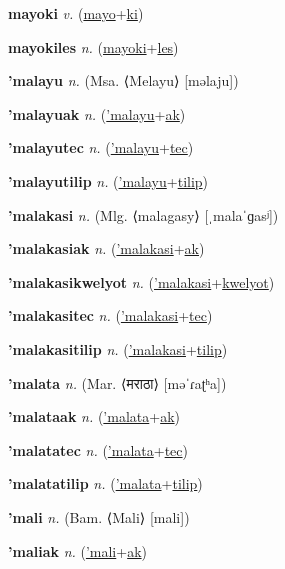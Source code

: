 \textbf{\hypertarget{mayoki}{mayoki}} \textit{v.} (\hyperlink{mayo}{mayo}+\allowbreak \hyperlink{ki}{ki})


\textbf{\hypertarget{mayokiles}{mayokiles}} \textit{n.} (\hyperlink{mayoki}{mayoki}+\allowbreak \hyperlink{les}{les})


\textbf{\hypertarget{'malayu}{'malayu}} \textit{n.} (Msa. ⟨Melayu⟩ [məlaju])


\textbf{\hypertarget{'malayuak}{'malayuak}} \textit{n.} (\hyperlink{'malayu}{'malayu}+\allowbreak \hyperlink{ak}{ak})


\textbf{\hypertarget{'malayutec}{'malayutec}} \textit{n.} (\hyperlink{'malayu}{'malayu}+\allowbreak \hyperlink{tec}{tec})


\textbf{\hypertarget{'malayutilip}{'malayutilip}} \textit{n.} (\hyperlink{'malayu}{'malayu}+\allowbreak \hyperlink{tilip}{tilip})


\textbf{\hypertarget{'malakasi}{'malakasi}} \textit{n.} (Mlg. ⟨malagasy⟩ [ˌmalaˈɡasʲ])


\textbf{\hypertarget{'malakasiak}{'malakasiak}} \textit{n.} (\hyperlink{'malakasi}{'malakasi}+\allowbreak \hyperlink{ak}{ak})


\textbf{\hypertarget{'malakasikwelyot}{'malakasikwelyot}} \textit{n.} (\hyperlink{'malakasi}{'malakasi}+\allowbreak \hyperlink{kwelyot}{kwelyot})


\textbf{\hypertarget{'malakasitec}{'malakasitec}} \textit{n.} (\hyperlink{'malakasi}{'malakasi}+\allowbreak \hyperlink{tec}{tec})


\textbf{\hypertarget{'malakasitilip}{'malakasitilip}} \textit{n.} (\hyperlink{'malakasi}{'malakasi}+\allowbreak \hyperlink{tilip}{tilip})


\textbf{\hypertarget{'malata}{'malata}} \textit{n.} (Mar. ⟨{\devanagari{}मराठा}⟩ [məˈɾaʈʰa])


\textbf{\hypertarget{'malataak}{'malataak}} \textit{n.} (\hyperlink{'malata}{'malata}+\allowbreak \hyperlink{ak}{ak})


\textbf{\hypertarget{'malatatec}{'malatatec}} \textit{n.} (\hyperlink{'malata}{'malata}+\allowbreak \hyperlink{tec}{tec})


\textbf{\hypertarget{'malatatilip}{'malatatilip}} \textit{n.} (\hyperlink{'malata}{'malata}+\allowbreak \hyperlink{tilip}{tilip})


\textbf{\hypertarget{'mali}{'mali}} \textit{n.} (Bam. ⟨Mali⟩ [mali])


\textbf{\hypertarget{'maliak}{'maliak}} \textit{n.} (\hyperlink{'mali}{'mali}+\allowbreak \hyperlink{ak}{ak})


